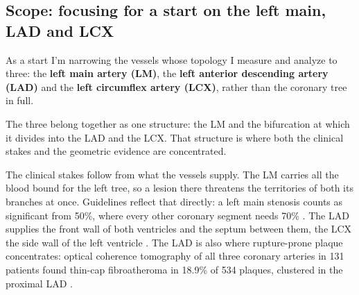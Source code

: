 
\subsection{Scope: focusing for a start on the left main, LAD and LCX}

As a start I'm narrowing the vessels whose topology I measure and analyze to three: the \textbf{left main
artery (LM)}, the \textbf{left anterior descending artery (LAD)} and the \textbf{left circumflex
artery (LCX)}, rather than the coronary tree in full.

The three belong together as one structure: the LM and the bifurcation at which it divides into the
LAD and the LCX. That structure is where both the clinical stakes and the geometric evidence are
concentrated.

The clinical stakes follow from what the vessels supply. The LM carries all the blood bound for the
left tree, so a lesion there threatens the territories of both its branches at once. Guidelines
reflect that directly: a left main stenosis counts as significant from 50\%, where every other
coronary segment needs 70\% \cite{lawton2022revasc}. The LAD
supplies the front wall of both ventricles and the septum between them, the LCX the side wall of the
left ventricle \cite{devos2024coronary,obrien2007anatomy}. The LAD is also where rupture-prone plaque
concentrates: optical coherence tomography of all three coronary arteries in 131 patients found
thin-cap fibroatheroma in 18.9\% of 534 plaques, clustered in the proximal LAD
\cite{araki2020plaques}.

